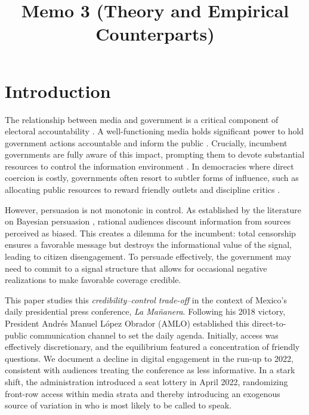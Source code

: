\documentclass[12pt]{article}
\title{Memo 3 (Theory and Empirical Counterparts)}
\author{}
\date{}
\begin{document}
\maketitle


\section{Introduction}

The relationship between media and government is a critical component of electoral accountability \citep{Audits-Ferraz-QJE, PolInfo-Enriquez-JEEA, Marshall}. A well-functioning media holds significant power to hold government actions accountable and inform the public \citep{Stromberg-MediaCoverage}. Crucially, incumbent governments are fully aware of this impact, prompting them to devote substantial resources to control the information environment \citep{Autocracy-Guriev-JPE}. In democracies where direct coercion is costly, governments often resort to subtler forms of influence, such as allocating public resources to reward friendly outlets and discipline critics \citep{ArgCorr-DiTella-AEJAE, MediaCaptures-Zeidl-Econometrica}.

However, persuasion is not monotonic in control. As established by the literature on Bayesian persuasion \citep{MediaBias-Gentzkow-JPE, PersuasionEmpirical-Dellavigna-AR}, rational audiences discount information from sources perceived as biased. This creates a dilemma for the incumbent: total censorship ensures a favorable message but destroys the informational value of the signal, leading to citizen disengagement. To persuade effectively, the government may need to commit to a signal structure that allows for occasional negative realizations to make favorable coverage credible.

This paper studies this \textit{credibility--control trade-off} in the context of Mexico's daily presidential press conference, \textit{La Mañanera}. Following his 2018 victory, President Andrés Manuel López Obrador (AMLO) established this direct-to-public communication channel to set the daily agenda. Initially, access was effectively discretionary, and the equilibrium featured a concentration of friendly questions. We document a decline in digital engagement in the run-up to 2022, consistent with audiences treating the conference as less informative. In a stark shift, the administration introduced a seat lottery in April 2022, randomizing front-row access within media strata and thereby introducing an exogenous source of variation in who is most likely to be called to speak.
\end{document}
